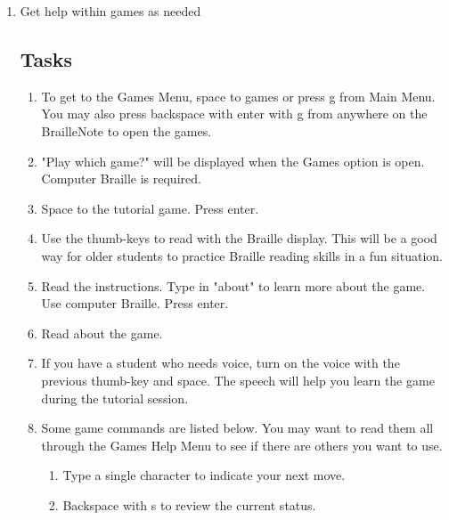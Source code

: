 \documentclass[10pt,letterpaper,twoside]{report}
\begin{document}
{{{{\begin{enumerate}
	\item Get help within games as needed
	      
	      
	      
	       \subsection{Tasks}
	      
	      
	      
	      \begin{enumerate}
		      \item To get to the Games Menu, space to games or press g from Main Menu.  You may also press backspace with enter with g from anywhere on the BrailleNote to open the games.
		            
		      \item "Play which game?" will be displayed when the Games option is open. Computer Braille is required.
		            
		      \item Space to the tutorial game.  Press enter.
		            
		      \item Use the thumb-keys to read with the Braille display.  This will be a good way for older students to practice Braille reading skills in a fun situation.
		            
		      \item Read the instructions. Type in "about" to learn more about the game.  Use computer Braille.  Press enter.
		            
		      \item Read about the game.
		            
		      \item If you have a student who needs voice, turn on the voice with the previous thumb-key and space.  The speech will help you learn the game during the tutorial session.
		            
		      \item Some game commands are listed below.  You may want to read them all through the Games Help Menu to see if there are others you want to use.
		            
		            \begin{enumerate}
			            \item Type a single character to indicate your next move.
			                  
			            \item Backspace with s to review the current status.
			                  

\end{enumerate}
\end{enumerate}
\end{enumerate}}}}}
\end{document}
